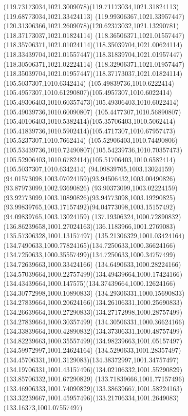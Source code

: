 {{	\curveto(119.73173034,1021.3009078)(119.71173034,1021.31824113)(119.68773034,1021.33424113)
	\curveto(119.99306367,1021.33957447)(120.31306366,1021.2609078)(120.62373032,1021.13290781)
	\moveto(118.37173037,1021.01824114)
	\curveto(118.36506371,1021.01557447)(118.35706371,1021.01024114)(118.35039704,1021.00624114)
	\curveto(118.33439704,1021.01557447)(118.31839704,1021.01957447)(118.30506371,1021.02224114)
	\curveto(118.32906371,1021.01957447)(118.35039704,1021.01957447)(118.37173037,1021.01824114)
	\moveto(105.5037307,1010.6342414)
	\curveto(105.49839736,1010.6222414)(105.4957307,1010.61290807)(105.4957307,1010.6022414)
	\curveto(105.49306403,1010.60357473)(105.49306403,1010.6022414)(105.49039736,1010.60090807)
	\curveto(105.4477307,1010.56890807)(105.40106403,1010.5382414)(105.35706403,1010.5062414)
	\curveto(105.41839736,1010.5902414)(105.4717307,1010.67957473)(105.5237307,1010.7662414)
	\curveto(105.52906403,1010.74490806)(105.53439736,1010.72490807)(105.54239736,1010.70357473)
	\curveto(105.52906403,1010.6782414)(105.51706403,1010.6582414)(105.5037307,1010.6342414)
	\moveto(94.09839765,1003.13024159)
	\curveto(94.01573098,1003.07024159)(93.94506432,1003.00490826)(93.87973099,1002.93690826)
	\curveto(93.90373099,1003.02224159)(93.92773099,1003.10890826)(93.94773098,1003.19290825)
	\curveto(93.99839765,1003.17157492)(94.04773098,1003.15157492)(94.09839765,1003.13024159)
	\moveto(137.19306324,1000.72890832)
	\curveto(136.86239658,1001.27024163)(136.1183966,1001.2769083)(135.57306328,1001.13157497)
	\curveto(135.21306329,1001.03424164)(134.7490633,1000.77824165)(134.7250633,1000.36624166)
	\curveto(134.7250633,1000.35557499)(134.7250633,1000.34757499)(134.72639663,1000.33424166)
	\curveto(134.6490633,1000.28224166)(134.57039664,1000.22757499)(134.49439664,1000.17424166)
	\curveto(134.43439664,1000.147575)(134.37439664,1000.12624166)(134.30772998,1000.10890833)
	\curveto(134.29306331,1000.15690833)(134.27839664,1000.20624166)(134.26106331,1000.25690833)
	\curveto(134.26639664,1000.27290833)(134.27172998,1000.28757499)(134.27839664,1000.30357499)
	\curveto(134.30506331,1000.36624166)(134.33839664,1000.42890832)(134.37306331,1000.48757499)
	\curveto(134.82239663,1000.35557499)(134.98239663,1001.05157497)(134.59972997,1001.24624164)
	\curveto(134.5290633,1001.28357497)(134.45706331,1001.3129083)(134.38372997,1001.34757497)
	\curveto(134.19706331,1001.43157496)(134.02106332,1001.55290829)(133.85706332,1001.67290829)
	\curveto(133.71839666,1001.77157496)(133.46906333,1001.74090829)(133.38639667,1001.58224163)
	\curveto(133.32239667,1001.45957496)(133.21706334,1001.2649083)(133.16373,1001.07557497)
}}
